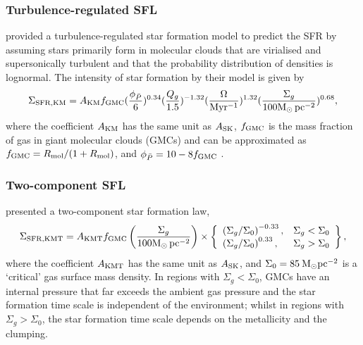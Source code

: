 \documentclass[12pt,preprint]{aastex}
\begin{document}


\subsubsection{Turbulence-regulated SFL}
\label{sfl_turbulence}
\citet{kru05} provided a  turbulence-regulated star formation model to predict the SFR by assuming stars primarily form in molecular clouds that are virialised and supersonically turbulent and that the probability distribution of densities is lognormal. The intensity of star formation by their model is given by
\begin{equation}
\Sigma_{\rm SFR,KM}= A_{\rm KM} f_{\rm GMC} (\frac{\phi_{\bar{P}}}{6}) ^{0.34} (\frac{Q_g}{1.5}) ^{-1.32} (\frac{\Omega}{\rm Myr^{-1}})^{1.32} (\frac{\Sigma_{g}}{\rm 100 M_{\odot}\, pc^{-2}}) ^{0.68},
\end{equation}
where the coefficient $A_{\rm KM}$ has the same unit as $A_{\rm SK}$, 
$f_{\rm GMC}$ is the mass fraction of gas in giant molecular clouds (GMCs) and can be approximated as $f_{\rm GMC} =R_{\rm mol}/(1+R_{\rm mol})$, and $\phi_{\bar{P}}=10-8f_{\rm GMC}$ \citep{kru05, tan10}.


\subsubsection{Two-component SFL}
\label{sfl_2comp}
\citet{kru09} presented a two-component star formation law, 
\begin{eqnarray}
\label{sfrKMT}
\Sigma_{\rm SFR,KMT}  =  A_{\rm KMT} f_{\rm GMC} \left( \frac{\Sigma_g}{\rm 100 M_{\odot}\, pc^{-2}} \right) \times \left\{ 
\begin{array}{lc}
\left(\Sigma_g/\Sigma_0\right)^{-0.33}, & \Sigma_g< \Sigma_0\\
\left(\Sigma_g/\Sigma_0\right)^{0.33}, & \Sigma_g> \Sigma_0
\end{array}
\right\},
\end{eqnarray}
where the coefficient $A_{\rm KMT}$ has the same unit as $A_{\rm SK}$,
and $\Sigma_0=85\:{\rm M_\odot pc^{-2}}$ is a `critical' gas surface mass density. In regions with $\Sigma_g < \Sigma_0$, GMCs have an internal pressure that far exceeds the ambient gas pressure and the star formation time scale is independent of the environment; whilst in regions with $\Sigma_g > \Sigma_0$,  the star formation time scale depends  on the metallicity and the clumping.
\end{document}
